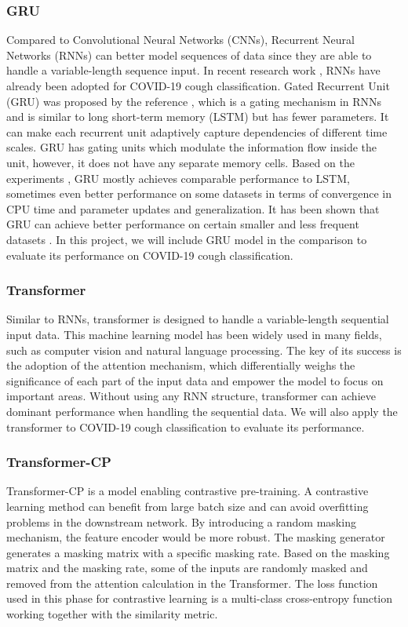 \documentclass[11pt]{article}
\begin{document}
\subsubsection{GRU}
Compared to Convolutional Neural Networks (CNNs), Recurrent Neural Networks (RNNs) can better
model sequences of data since they are able to handle a variable-length sequence input.
In recent research work \cite{Yang1st, Yang2nd}, RNNs have already been adopted for COVID-19 cough classification.
Gated Recurrent Unit (GRU) was proposed by the reference \cite{cho-etal-2014-properties}, which is a gating mechanism in RNNs \cite{Wang2nd} and is similar to long short-term memory (LSTM) \cite{Yang4th} but has fewer parameters. It can make each recurrent unit adaptively capture dependencies of different time scales.
GRU has gating units which
modulate the information flow inside the unit, however, it does not have any separate memory cells.
Based on the experiments \cite{Wang2nd}, GRU mostly achieves comparable performance to LSTM, sometimes
even better performance on some datasets in terms of convergence in CPU time and parameter updates and
generalization. It has been shown that GRU can achieve better
performance on certain smaller and less frequent datasets \cite{Yang4th}. 
In this project, we will include
GRU model in the comparison to evaluate its performance on COVID-19 cough classification.


\subsubsection{Transformer}
Similar to RNNs, transformer \cite{Yang5th} is designed to handle a variable-length sequential input data.
This machine learning model has been widely used in many fields, such as computer vision and
natural language processing. The key of its success is the adoption of the attention mechanism,
which differentially weighs the significance of each part of the input data and empower the model
to focus on important areas. Without using any RNN structure, transformer can achieve dominant
performance when handling the sequential data. We will also apply the transformer to COVID-19 cough
classification to evaluate its performance.

\subsubsection{Transformer-CP}
Transformer-CP is a model enabling contrastive pre-training. A contrastive learning method can
benefit from large batch size and can avoid overfitting problems in the downstream network. By
introducing a random masking mechanism, the feature encoder would be more robust. The masking
generator generates a masking matrix with a specific masking rate. Based on the masking matrix
and the masking rate, some of the inputs are randomly masked and removed from the attention calculation
in the Transformer. The loss function used in this phase for contrastive learning is a multi-class
cross-entropy function working together with the similarity metric.\\
\end{document}
